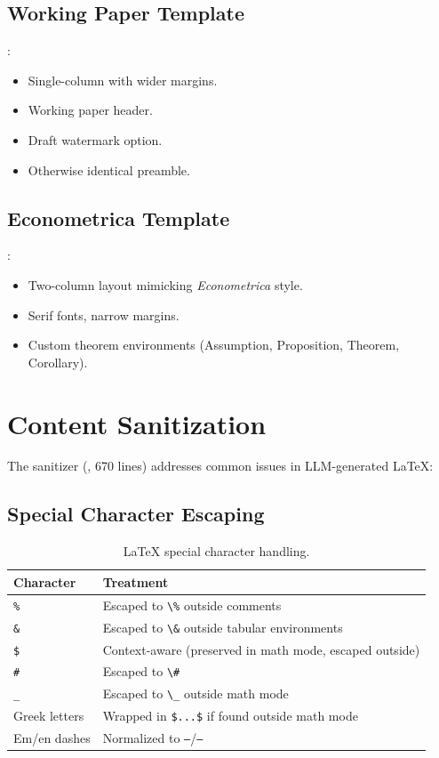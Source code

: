 \subsection{Working Paper Template}

:
\begin{itemize}
  \item Single-column with wider margins.
  \item Working paper header.
  \item Draft watermark option.
  \item Otherwise identical preamble.
\end{itemize}

\subsection{Econometrica Template}

:
\begin{itemize}
  \item Two-column layout mimicking \emph{Econometrica} style.
  \item Serif fonts, narrow margins.
  \item Custom theorem environments (Assumption, Proposition, Theorem, Corollary).
\end{itemize}

\section{Content Sanitization}
\label{sec:paper:sanitization}

The sanitizer (, 670 lines) addresses common issues in LLM-generated \LaTeX{}:

\subsection{Special Character Escaping}

\begin{table}[H]
\centering
\caption{\LaTeX{} special character handling.}
\label{tab:latex-escape}
\begin{tabular}{ll}
\toprule
\textbf{Character} & \textbf{Treatment} \\
\midrule
\texttt{\%} & Escaped to \texttt{\textbackslash\%} outside comments \\
\texttt{\&} & Escaped to \texttt{\textbackslash\&} outside tabular environments \\
\texttt{\$} & Context-aware (preserved in math mode, escaped outside) \\
\texttt{\#} & Escaped to \texttt{\textbackslash\#} \\
\texttt{\_} & Escaped to \texttt{\textbackslash\_} outside math mode \\
Greek letters & Wrapped in \texttt{\$...\$} if found outside math mode \\
Em/en dashes & Normalized to \texttt{---}/\texttt{--} \\
\bottomrule
\end{tabular}
\end{table}


